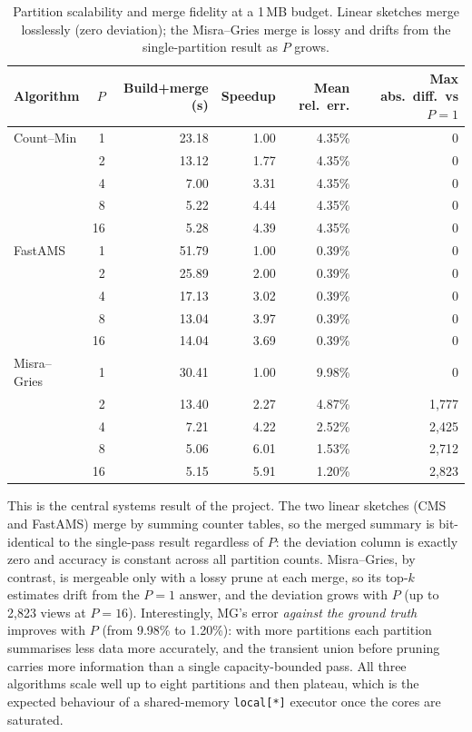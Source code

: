 \documentclass[12pt]{article}
\begin{document}
\begin{table}[H]
\centering
\small
\begin{tabular}{lrrrrr}
\hline
\textbf{Algorithm} & \textbf{$P$} & \textbf{Build+merge (s)} & \textbf{Speedup} & \textbf{Mean rel.\ err.} & \textbf{Max abs.\ diff.\ vs $P{=}1$} \\
\hline
Count--Min   & 1  & 23.18 & 1.00 & 4.35\% & 0 \\
             & 2  & 13.12 & 1.77 & 4.35\% & 0 \\
             & 4  & 7.00  & 3.31 & 4.35\% & 0 \\
             & 8  & 5.22  & 4.44 & 4.35\% & 0 \\
             & 16 & 5.28  & 4.39 & 4.35\% & 0 \\
\hline
FastAMS      & 1  & 51.79 & 1.00 & 0.39\% & 0 \\
             & 2  & 25.89 & 2.00 & 0.39\% & 0 \\
             & 4  & 17.13 & 3.02 & 0.39\% & 0 \\
             & 8  & 13.04 & 3.97 & 0.39\% & 0 \\
             & 16 & 14.04 & 3.69 & 0.39\% & 0 \\
\hline
Misra--Gries & 1  & 30.41 & 1.00 & 9.98\% & 0 \\
             & 2  & 13.40 & 2.27 & 4.87\% & 1{,}777 \\
             & 4  & 7.21  & 4.22 & 2.52\% & 2{,}425 \\
             & 8  & 5.06  & 6.01 & 1.53\% & 2{,}712 \\
             & 16 & 5.15  & 5.91 & 1.20\% & 2{,}823 \\
\hline
\end{tabular}
\caption{Partition scalability and merge fidelity at a 1\,MB budget. Linear
sketches merge losslessly (zero deviation); the Misra--Gries merge is lossy and
drifts from the single-partition result as $P$ grows.}
\label{tab:dist}
\end{table}

This is the central systems result of the project. The two linear sketches (CMS
and FastAMS) merge by summing counter tables, so the merged summary is
bit-identical to the single-pass result regardless of $P$: the deviation column
is exactly zero and accuracy is constant across all partition counts.
Misra--Gries, by contrast, is mergeable only with a lossy prune at each merge, so
its top-$k$ estimates drift from the $P{=}1$ answer, and the deviation grows with
$P$ (up to 2{,}823 views at $P{=}16$). Interestingly, MG's error \emph{against
the ground truth} improves with $P$ (from 9.98\% to 1.20\%): with more
partitions each partition summarises less data more accurately, and the
transient union before pruning carries more information than a single
capacity-bounded pass. All three algorithms scale well up to eight partitions
and then plateau, which is the expected behaviour of a shared-memory
\texttt{local[*]} executor once the cores are saturated.
\end{document}

